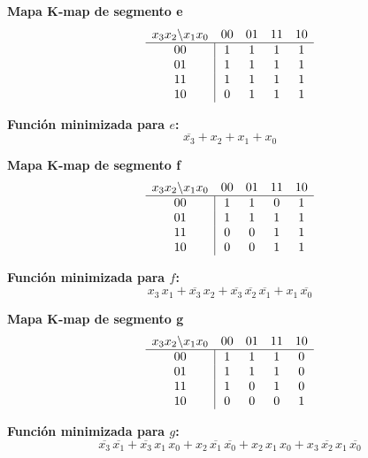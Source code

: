 \documentclass[12pt]{article}
\begin{document}
\noindent
\textbf{Mapa K‐map de segmento \textsf{e}}  
\[
\begin{array}{c|cccc}
\multicolumn{1}{c}{x_3x_2 \backslash x_1x_0} & 00 & 01 & 11 & 10 \\
\hline
00 & 1 & 1 & 1 & 1 \\
01 & 1 & 1 & 1 & 1 \\
11 & 1 & 1 & 1 & 1 \\
10 & 0 & 1 & 1 & 1 \\
\end{array}
\]
\vspace{1em}

\noindent
\textbf{Función minimizada para \(e\):}
\[
\overline{x_3} + x_2 + x_1 + x_0
\]

\noindent
\textbf{Mapa K‐map de segmento \textsf{f}}  
\[
\begin{array}{c|cccc}
\multicolumn{1}{c}{x_3x_2 \backslash x_1x_0} & 00 & 01 & 11 & 10 \\
\hline
00 & 1 & 1 & 0 & 1 \\
01 & 1 & 1 & 1 & 1 \\
11 & 0 & 0 & 1 & 1 \\
10 & 0 & 0 & 1 & 1 \\
\end{array}
\]
\vspace{1em}

\noindent
\textbf{Función minimizada para \(f\):}
\[
x_3\,x_1 + \overline{x_3}\,x_2 + \overline{x_3}\,\overline{x_2}\,\overline{x_1} + x_1\,\overline{x_0}
\]

\noindent
\textbf{Mapa K‐map de segmento \textsf{g}}  
\[
\begin{array}{c|cccc}
\multicolumn{1}{c}{x_3x_2 \backslash x_1x_0} & 00 & 01 & 11 & 10 \\
\hline
00 & 1 & 1 & 1 & 0 \\
01 & 1 & 1 & 1 & 0 \\
11 & 1 & 0 & 1 & 0 \\
10 & 0 & 0 & 0 & 1 \\
\end{array}
\]
\vspace{1em}

\noindent
\textbf{Función minimizada para \(g\):}
\[
\overline{x_3}\,\overline{x_1} + \overline{x_3}\,x_1\,x_0 + x_2\,\overline{x_1}\,\overline{x_0} + x_2\,x_1\,x_0 + x_3\,\overline{x_2}\,x_1\,\overline{x_0}
\]

\newpage

\end{document}
